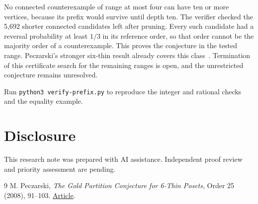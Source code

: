 \documentclass[11pt]{article}
\begin{document}
No connected counterexample of range at most four can have ten or more vertices, because its prefix would survive until depth ten. The verifier checked the 5,692 shorter connected candidates left after pruning. Every such candidate had a reversal probability at least $1/3$ in its reference order, so that order cannot be the majority order of a counterexample. This proves the conjecture in the tested range. Peczarski's stronger six-thin result already covers this class~\cite{Peczarski}. Termination of this certificate search for the remaining ranges is open, and the unrestricted conjecture remains unresolved.

Run \texttt{python3 verify-prefix.py} to reproduce the integer and rational checks and the equality example.

\section*{Disclosure}
This research note was prepared with AI assistance. Independent proof review and priority assessment are pending.

\begin{thebibliography}{9}
 M. Peczarski, \emph{The Gold Partition Conjecture for 6-Thin Posets}, Order 25 (2008), 91--103. \href{https://doi.org/10.1007/s11083-008-9081-9}{Article}.
\end{thebibliography}
\end{document}
